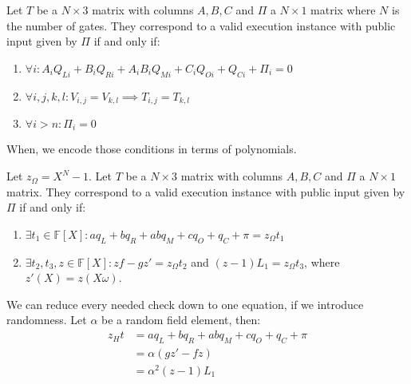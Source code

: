 \documentclass[../lecture-notes.tex]{subfiles}
\begin{document}
\begin{definition}
Let $T$ be a $N \times 3$ matrix with columns $A, B, C$ and $\Pi$ a $N \times 1$
matrix where $N$ is the number of gates. They correspond to a valid execution
instance with public input given by $\Pi$ if and only if:

\begin{enumerate}
    \item \(\forall i: A_iQ_{Li} + B_iQ_{Ri} + A_iB_iQ_{Mi} + C_iQ_{Oi} + Q_{Ci} + \Pi_i = 0\)
    \item \(\forall i, j, k, l: V_{i,j} = V_{k,l} \implies T_{i,j} = T_{k,l}\)
    \item \(\forall i > n: \Pi_i = 0\)
\end{enumerate}
\end{definition}

When, we encode those conditions in terms of polynomials.

\begin{definition}
Let $z_{\Omega} = X^N - 1$. Let $T$ be a $N \times 3$ matrix with columns $A, B,
C$ and $\Pi$ a $N \times 1$ matrix. They correspond to a valid execution
instance with public input given by $\Pi$ if and only if:

\begin{enumerate}
    \item \(\exists t_1 \in \mathbb{F}[X]: aq_L + bq_R + abq_M + cq_O + q_C + \pi = z_{\Omega}t_1\)
    \item \(\exists t_2, t_3, z \in \mathbb{F}[X]: zf - gz' = z_{\Omega}t_2\) and \((z-1)L_1 = z_{\Omega}t_3\), where $z'(X) = z(X\omega)$.
\end{enumerate}
\end{definition}
\begin{remark}
We can reduce every needed check down to one equation, if we introduce randomness.
Let $\alpha$ be a random field element, then: 
\[
    \begin{aligned}
        z_Ht &= aq_L + bq_R + abq_M + cq_O + q_C + \pi \\
        &= \alpha(gz' - fz) \\
        &= \alpha^2(z - 1)L_1
    \end{aligned}
\]
\end{remark}
\end{document}
